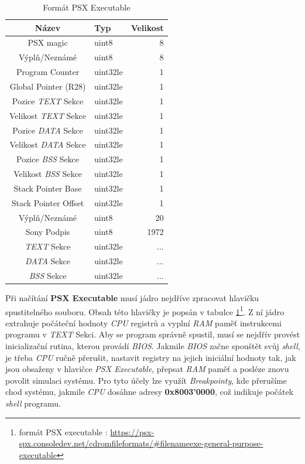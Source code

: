 \begin{table}[htbp]
    \caption{Formát PSX Executable}
    \begin{center}
    \begin{tabular}{ |c|l|r| }
     \hline
     \textbf{Název} & \textbf{Typ} & \textbf{Velikost} \\
     \hline
     PSX magic & uint8 & 8 \\
     Výplň/Neznámé & uint8 & 8 \\
     Program Counter & uint32le & 1 \\
     Global Pointer (R28) & uint32le & 1 \\
     Pozice \textit{TEXT} Sekce & uint32le & 1 \\
     Velikost \textit{TEXT} Sekce & uint32le & 1 \\
     Pozice \textit{DATA} Sekce & uint32le & 1 \\
     Velikost \textit{DATA} Sekce & uint32le & 1 \\
     Pozice \textit{BSS} Sekce & uint32le & 1 \\
     Velikost \textit{BSS} Sekce & uint32le & 1 \\
     Stack Pointer Base & uint32le & 1 \\
     Stack Pointer Offset & uint32le & 1 \\
     Výplň/Neznámé & uint8 & 20 \\
     Sony Podpis & uint8 & 1972 \\
     \textit{TEXT} Sekce & uint32le & ... \\
     \textit{DATA} Sekce & uint32le & ... \\
     \textit{BSS} Sekce & uint32le & ... \\
     \hline
    \end{tabular}
    \end{center}
    \label{psx-executable-format}
\end{table}

Při načítání \textbf{PSX Executable} musí jádro nejdříve zpracovat hlavičku spustitelného souboru. Obsah této hlavičky je popsán v tabulce \ref{psx-executable-format}\footnote{formát PSX executable \cite{PSXSpec}: \url{https://psx-spx.consoledev.net/cdromfileformats/\#filenameexe-general-purpose-executable}}.
Z ní jádro extrahuje počáteční hodnoty \textit{CPU} registrů a vyplní \textit{RAM} paměť instrukcemi programu v \textit{TEXT} Sekci.
Aby se program správně spustil, musí se nejdřív provést inicializační rutina, kterou provádí \textit{BIOS}.
Jakmile \textit{BIOS} začne spouštět svůj \textit{shell}, je třeba \textit{CPU} ručně přerušit, nastavit registry na 
jejich iniciální hodnoty tak, jak jsou obsaženy v hlavičce \textit{PSX Executable},
přepsat \textit{RAM} paměť a posléze znovu povolit simulaci systému.
Pro tyto účely lze využít \textit{Breakpointy}, kde přerušíme chod systému, jakmile \textit{CPU} dosáhne adresy \textbf{0x8003'0000}, což
indikuje počátek \textit{shell} programu.

